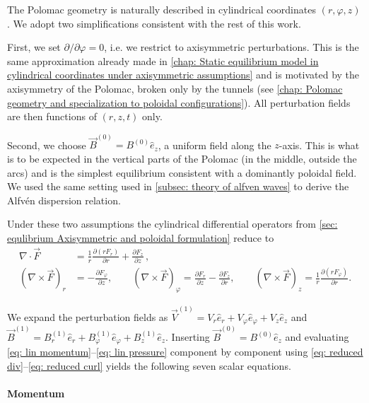 The Polomac geometry is naturally described in cylindrical coordinates
$(r, \varphi, z)$. We adopt two simplifications consistent with the rest of this
work.

First, we set $\partial/\partial\varphi = 0$, i.e. we restrict to axisymmetric
perturbations. This is the same approximation already made in
\autoref{chap: Static equilibrium model in cylindrical coordinates under axisymmetric assumptions}
and is motivated by the axisymmetry of the Polomac, broken only by the tunnels
(see \autoref{chap: Polomac geometry and specialization to poloidal configurations}). All
perturbation fields are then functions of $(r, z, t)$ only.

Second, we choose $\vec{B}^{(0)} = B^{(0)}\hat{e}_z$, a uniform field along the
$z$-axis. This is what is to be expected in the vertical parts of the Polomac
(in the middle, outside the arcs) and is the simplest equilibrium consistent with a dominantly poloidal
field. We used the same setting
used in \autoref{subsec: theory of alfven waves} to derive the Alfv\'{e}n
dispersion relation.

Under these two assumptions the cylindrical differential operators from
\autoref{sec: equlibrium Axisymmetric and poloidal formulation} reduce to
\begin{align}
    \nabla \cdot \vec{F} &= \frac{1}{r}\frac{\partial(r F_r)}{\partial r}
        + \frac{\partial F_z}{\partial z} \, ,
    \label{eq: reduced div} \\
    (\nabla \times \vec{F})_r &= -\frac{\partial F_\varphi}{\partial z}, \qquad
    (\nabla \times \vec{F})_\varphi = \frac{\partial F_r}{\partial z}
        - \frac{\partial F_z}{\partial r}, \qquad
    (\nabla \times \vec{F})_z = \frac{1}{r}\frac{\partial(r F_\varphi)}{\partial r}.
    \label{eq: reduced curl}
\end{align}



We expand the perturbation fields as
$\vec{V}^{(1)} = V_r\hat{e}_r + V_\varphi\hat{e}_\varphi + V_z\hat{e}_z$ and
$\vec{B}^{(1)} = B_r^{(1)}\hat{e}_r + B_\varphi^{(1)}\hat{e}_\varphi + B_z^{(1)}\hat{e}_z$.
Inserting $\vec{B}^{(0)} = B^{(0)}\hat{e}_z$ and evaluating
\eqref{eq: lin momentum}--\eqref{eq: lin pressure} component by component using
\eqref{eq: reduced div}--\eqref{eq: reduced curl} yields the following seven
scalar equations.

\paragraph{Momentum}

